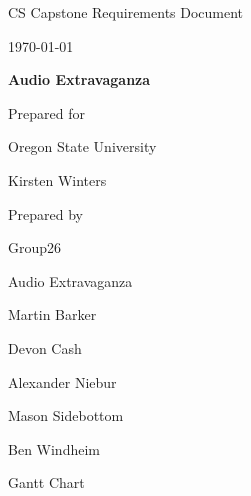 \documentclass[onecolumn, draftclsnofoot,10pt, compsoc]{IEEEtran}
\def \CapstoneTeamName{Audio Extravaganza}
\def \CapstoneTeamNumber{26}
\def \GroupMemberOne{Martin Barker}
\def \GroupMemberTwo{Devon Cash}
\def \GroupMemberThree{Alexander Niebur}
\def \GroupMemberFour{Mason Sidebottom}
\def \GroupMemberFive{Ben Windheim}
\def \CapstoneProjectName{Audio Extravaganza}
\def \CapstoneSponsorCompany{Oregon State University}
\def \CapstoneSponsorPerson{Kirsten Winters}
\def \DocType{		
				Requirements Document
				}
\newcommand{\NameSigPair}[1]{\par
\makebox[2.75in][r]{#1} \hfil 	\makebox[3.25in]{\makebox[2.25in]{\hrulefill} \hfill		\makebox[.75in]{\hrulefill}}
\par\vspace{-12pt} \textit{\tiny\noindent
\makebox[2.75in]{} \hfil		\makebox[3.25in]{\makebox[2.25in][r]{Signature} \hfill	\makebox[.75in][r]{Date}}}}
\renewcommand{\NameSigPair}[1]{#1}
\begin{document}
\begin{titlepage}
    \begin{singlespace}
        \hfill  
        \par\vspace{.2in}
        \centering
        \scshape{
            \huge CS Capstone \DocType \par
            {\large\today}\par
            \vspace{.5in}
            \textbf{\Huge\CapstoneProjectName}\par
            \vfill
            {\large Prepared for}\par
            \Huge \CapstoneSponsorCompany\par
            \vspace{5pt}
            {\Large\NameSigPair{\CapstoneSponsorPerson}\par}
            {\large Prepared by }\par
            Group\CapstoneTeamNumber\par
            \CapstoneTeamName\par 
            \vspace{5pt}
            {\Large
                \NameSigPair{\GroupMemberOne}\par
                \NameSigPair{\GroupMemberTwo}\par
                \NameSigPair{\GroupMemberThree}\par
                \NameSigPair{\GroupMemberFour}\par
                \NameSigPair{\GroupMemberFive}\par
            }
            \vspace{20pt}
        }

		
    \end{singlespace}
\end{titlepage}
\newpage
{}
\tableofcontents

\clearpage



\clearpage



% 
% 


\newpage
Gantt Chart\\

\newpage


\end{document}
